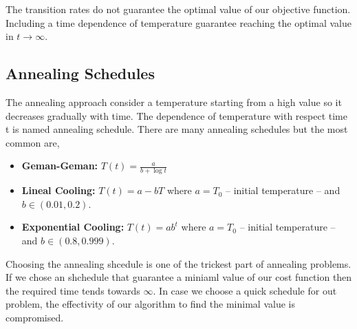  The transition rates do not guarantee the optimal value of our objective function. Including a time dependence of temperature guarantee reaching the optimal value in $t \rightarrow \infty$.
\subsection{Annealing Schedules}
The annealing approach consider a temperature starting from a high value so it decreases gradually with time. The dependence of temperature with respect time t is named annealing schedule. There are many annealing schedules but the most common are,
\begin{itemize}
    \item \textbf{Geman-Geman:} $T(t) = \frac{a}{b + \log{t}}$
    \item \textbf{Lineal Cooling:} $T(t) = a - bT$ where $a = T_{0}$ -- initial temperature -- and $b \in (0.01,0.2)$.
    \item \textbf{Exponential Cooling:} $T(t) = ab^{t}$ where $a = T_{0}$ -- initial temperature -- and $b \in (0.8,0.999)$.
\end{itemize}
Choosing the annealing shcedule is one of the trickest part of annealing problems. If we chose an shchedule that guarantee a miniaml value of our cost function then the required time tends towards $\infty$. In case we choose a quick schedule for out problem, the effectivity of our algorithm to find the minimal value is compromised.